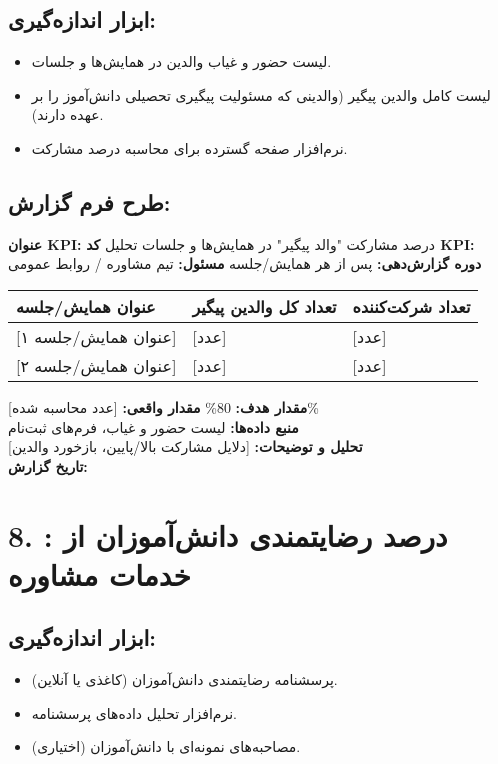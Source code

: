 \documentclass[11pt]{article}
\begin{document}
\subsection*{ابزار اندازه‌گیری:}
\begin{itemize}
    \item لیست حضور و غیاب والدین در همایش‌ها و جلسات.
    \item لیست کامل والدین پیگیر (والدینی که مسئولیت پیگیری تحصیلی دانش‌آموز را بر عهده دارند).
    \item نرم‌افزار صفحه گسترده برای محاسبه درصد مشارکت.
\end{itemize}

\subsection*{طرح فرم گزارش:}
\noindent\textbf{عنوان KPI:} درصد مشارکت "والد پیگیر" در همایش‌ها و جلسات تحلیل \hfill \textbf{کد KPI:}  \\
\noindent\textbf{دوره گزارش‌دهی:} پس از هر همایش/جلسه \hfill \textbf{مسئول:} تیم مشاوره / روابط عمومی \\

\bigskip
\begin{tabular}{lll}
\textbf{عنوان همایش/جلسه} & \textbf{تعداد کل والدین پیگیر} & \textbf{تعداد شرکت‌کننده} \\
\hline
{[عنوان همایش/جلسه ۱]} & {[عدد]} & {[عدد]} \\
{[عنوان همایش/جلسه ۲]} & {[عدد]} & {[عدد]} \\
\end{tabular}
\bigskip

\noindent\textbf{مقدار هدف:} 80\% \hfill \textbf{مقدار واقعی:} {[عدد محاسبه شده]\%} \\
\noindent\textbf{منبع داده‌ها:} لیست حضور و غیاب، فرم‌های ثبت‌نام \\
\noindent\textbf{تحلیل و توضیحات:} {[دلایل مشارکت بالا/پایین، بازخورد والدین]} \\
\noindent\textbf{تاریخ گزارش:} \\

\hrulefill
\bigskip

\section*{8. : درصد رضایتمندی دانش‌آموزان از خدمات مشاوره}

\subsection*{ابزار اندازه‌گیری:}
\begin{itemize}
    \item پرسشنامه رضایتمندی دانش‌آموزان (کاغذی یا آنلاین).
    \item نرم‌افزار تحلیل داده‌های پرسشنامه.
    \item مصاحبه‌های نمونه‌ای با دانش‌آموزان (اختیاری).
\end{itemize}
\end{document}
